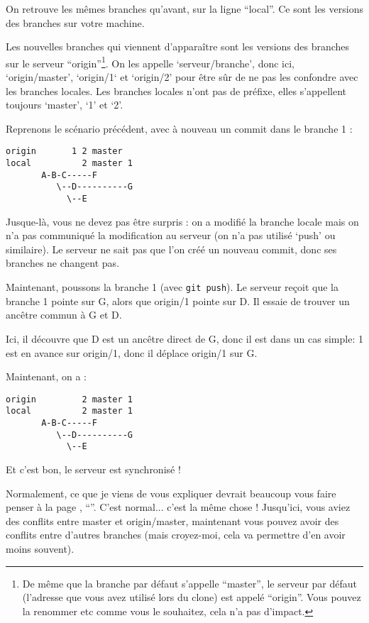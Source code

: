 \documentclass[10pt,a4paper]{article}
\begin{document}
On retrouve les mêmes branches qu'avant, sur la ligne ``local''. Ce sont les versions des branches sur votre machine.

Les nouvelles branches qui viennent d'apparaître sont les versions des branches sur le serveur ``origin''\footnote{De même que la branche par défaut s'appelle ``master'', le serveur par défaut (l'adresse que vous avez utilisé lors du clone) est appelé ``origin''. Vous pouvez la renommer etc comme vous le souhaitez, cela n'a pas d'impact.}. On les appelle `serveur/branche', donc ici, `origin/master', `origin/1` et `origin/2' pour être sûr de ne pas les confondre avec les branches locales. Les branches locales n'ont pas de préfixe, elles s'appellent toujours `master', `1' et `2'.

Reprenons le scénario précédent, avec à nouveau un commit dans le branche 1 :

\begin{verbatim}
origin       1 2 master
local          2 master 1
       A-B-C-----F
          \--D----------G
            \--E
\end{verbatim}

Jusque-là, vous ne devez pas être surpris : on a modifié la branche locale mais on n'a pas communiqué la modification au serveur (on n'a pas utilisé `push' ou similaire). Le serveur ne sait pas que l'on créé un nouveau commit, donc ses branches ne changent pas.

Maintenant, poussons la branche 1 (avec {\tt git push}). Le serveur reçoit que la branche 1 pointe sur G, alors que origin/1 pointe sur D. Il essaie de trouver un ancêtre commun à G et D.

Ici, il découvre que D est un ancêtre direct de G, donc il est dans un cas simple: 1 est en avance sur origin/1, donc il déplace origin/1 sur G.

Maintenant, on a :

\begin{verbatim}
origin         2 master 1
local          2 master 1
       A-B-C-----F
          \--D----------G
            \--E
\end{verbatim}

Et c'est bon, le serveur est synchronisé !

Normalement, ce que je viens de vous expliquer devrait beaucoup vous faire penser à la page \pageref{régler-conflits}, ``''. C'est normal... c'est la même chose ! Jusqu'ici, vous aviez des conflits entre master et origin/master, maintenant vous pouvez avoir des conflits entre d'autres branches (mais croyez-moi, cela va permettre d'en avoir moins souvent).
\end{document}
